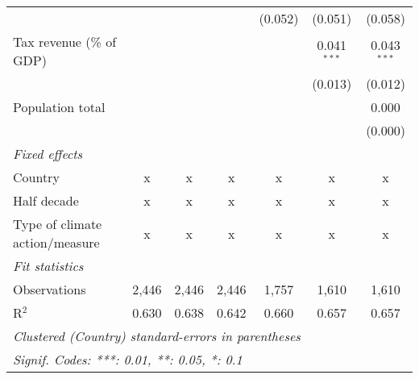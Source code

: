 \begin{tabular}{lcccccc}
                                                           &         &                &                & (0.052)        & (0.051)        & (0.058)\\   
   Tax revenue (\% of GDP)                                 &         &                &                &                & 0.041$^{***}$  & 0.043$^{***}$\\   
                                                           &         &                &                &                & (0.013)        & (0.012)\\   
   Population total                                        &         &                &                &                &                & 0.000\\   
                                                           &         &                &                &                &                & (0.000)\\   
   \emph{Fixed effects}\\
   Country                                                 & x       & x              & x              & x              & x              & x\\  
   Half decade                                             & x       & x              & x              & x              & x              & x\\  
   Type of climate action/measure                          & x       & x              & x              & x              & x              & x\\  
   \midrule \emph{Fit statistics}\\
   Observations                                            & 2,446   & 2,446          & 2,446          & 1,757          & 1,610          & 1,610\\  
   R$^2$                                                   & 0.630   & 0.638          & 0.642          & 0.660          & 0.657          & 0.657\\  
   \midrule
   \multicolumn{7}{l}{\emph{Clustered (Country) standard-errors in parentheses}}\\
   \multicolumn{7}{l}{\emph{Signif. Codes: ***: 0.01, **: 0.05, *: 0.1}}\\
\end{tabular}
\par\endgroup


